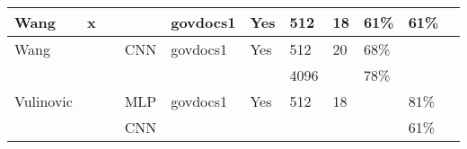 \begin{table*}[!ht]
{\begin{tabular}{|l|l|l|l|l|l|l|l|l|l|l|}
Wang \cite{wang_sparse_2018}                   & x   &     &      & govdocs1      & Yes   & 512      & 18       & 61\%       & 61\%      \\ \hline
Wang \cite{wang_file_2018}                     &     &     & CNN  & govdocs1      & Yes   & 512      & 20       & 68\%       &           \\
                                               &     &     &      &               &       & 4096     &          & 78\%       &           \\ \hline
Vulinovic \cite{vulinovic_neural_2019}         &     &     & MLP  & govdocs1      & Yes   & 512      & 18       &            & 81\%      \\
                                               &     &     & CNN  &               &       &          &          &            & 61\%      \\ \hline
\end{tabular}}
\end{table*}






